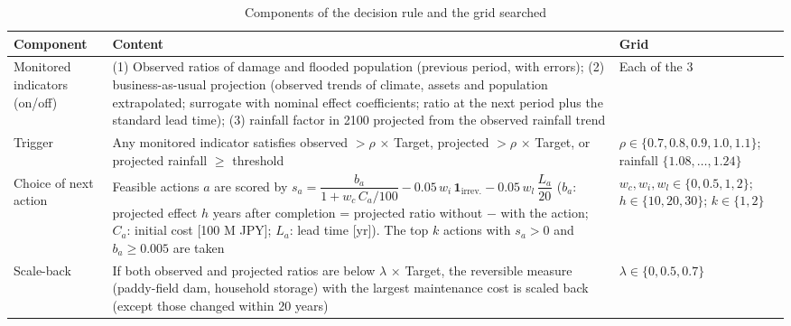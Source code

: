 \documentclass[a4paper,10pt]{ltjsarticle}
\begin{document}
\begin{table}[H]
\centering\small
\caption{Components of the decision rule and the grid searched}
\label{tab:policy}
\begin{tabularx}{\textwidth}{@{}>{\raggedright\arraybackslash}p{28mm} L >{\raggedright\arraybackslash}p{38mm}@{}}
\toprule
Component & Content & Grid \\
\midrule
Monitored indicators (on/off) & (1) Observed ratios of damage and flooded population (previous period, with errors); (2) business-as-usual projection (observed trends of climate, assets and population extrapolated; surrogate with nominal effect coefficients; ratio at the next period plus the standard lead time); (3) rainfall factor in 2100 projected from the observed rainfall trend & Each of the 3 \\
Trigger & Any monitored indicator satisfies observed $>\rho$ × Target, projected $>\rho$ × Target, or projected rainfall $\ge$ threshold & $\rho \in \{0.7,0.8,0.9,1.0,1.1\}$; rainfall $\{1.08,\dots,1.24\}$ \\
Choice of next action & Feasible actions $a$ are scored by $s_a = \dfrac{b_a}{1+w_c\,C_a/100}-0.05\,w_i\,\mathbf{1}_{\text{irrev.}}-0.05\,w_l\,\dfrac{L_a}{20}$ ($b_a$: projected effect $h$ years after completion = projected ratio without $-$ with the action; $C_a$: initial cost [100 M JPY]; $L_a$: lead time [yr]). The top $k$ actions with $s_a>0$ and $b_a \ge 0.005$ are taken & $w_c,w_i,w_l \in\{0,0.5,1,2\}$; $h\in\{10,20,30\}$; $k\in\{1,2\}$ \\
Scale-back & If both observed and projected ratios are below $\lambda$ × Target, the reversible measure (paddy-field dam, household storage) with the largest maintenance cost is scaled back (except those changed within 20 years) & $\lambda\in\{0,0.5,0.7\}$ \\
\bottomrule
\end{tabularx}
\end{table}
\end{document}
